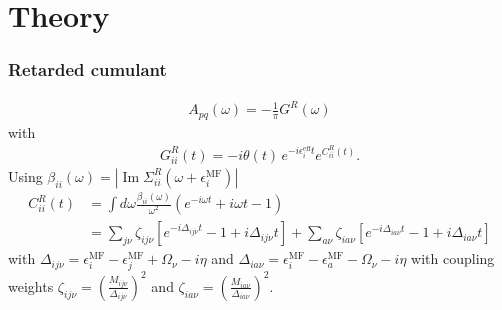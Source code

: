 \section{Theory}
\begin{frame}
    \frametitle{Retarded cumulant}
\begin{align}
    A_{pq}(\omega )=-\frac{1}{\pi}G^R(\omega)
\end{align}
with
\begin{align}
G_{ii}^R(t)=-i\theta(t)\, e^{-i \epsilon_i^{\text{eff}} t} e^{C_{ii}^R(t)}.
\end{align}\pause
Using $\beta_{ii}(\omega) = \left|\operatorname{Im} \Sigma_{ii}^R\left(\omega+\epsilon_i^{\text{MF}}\right)\right|$
\begin{align}
    C_{ii}^R(t)&=\int d \omega \frac{\beta_{ii}(\omega)}{\omega^2}\left(e^{-i \omega t}+i \omega t-1\right)\\
&= \sum_{j\nu} \zeta_{ij\nu} \left[ e^{-i\Delta_{ij\nu} t} - 1 + i\Delta_{ij\nu} t \right] + \sum_{a\nu} \zeta_{ia\nu} \left[ e^{-i\Delta_{ia\nu} t} - 1 + i\Delta_{ia\nu} t \right]
\label{eq:Cpp_2}
\end{align}
with $\Delta_{ij\nu} = \epsilon_i^{\text{MF}} - \epsilon_j^{\text{MF}} + \Omega_\nu - i\eta$ and $\Delta_{ia\nu} = \epsilon_i^{\text{MF}} - \epsilon_a^{\text{MF}} - \Omega_\nu - i\eta$ with coupling weights $\zeta_{ij\nu} = \left(\frac{M_{ij\nu}}{\Delta_{ij\nu}}\right)^2$ and $\zeta_{ia\nu} = \left(\frac{M_{ia\nu}}{\Delta_{ia\nu}}\right)^2$.
\end{frame}
